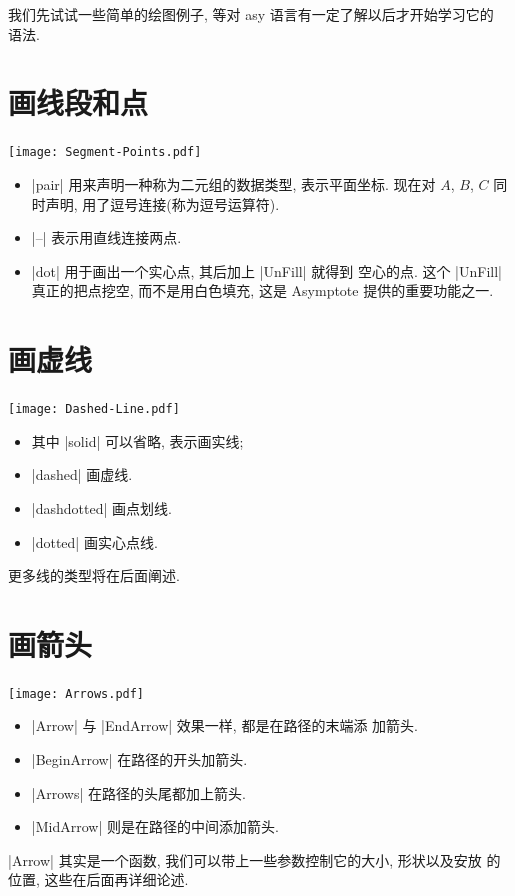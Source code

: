 \documentclass{ctexbook}
\begin{document}
我们先试试一些简单的绘图例子, 等对 asy 语言有一定了解以后才开始学习它的
语法.

\section{画线段和点}
\begin{center}\texttt{[image: Segment-Points.pdf]}\end{center}%

\begin{itemize}
\item |pair| 用来声明一种称为二元组的数据类型, 表示平面坐标. 现在对 $A$,
  $B$, $C$ 同时声明, 用了逗号连接(称为逗号运算符).
\item |--| 表示用直线连接两点.
\item |dot| 用于画出一个实心点, 其后加上 |UnFill| 就得到
  空心的点. 这个 |UnFill| 真正的把点挖空, 而不是用白色填充, 这是
  Asymptote 提供的重要功能之一.
\end{itemize}

\section{画虚线}
\begin{center}\texttt{[image: Dashed-Line.pdf]}\end{center}%

\begin{itemize}
\item  其中 |solid| 可以省略, 表示画实线;
\item |dashed| 画虚线.
\item |dashdotted| 画点划线.
\item |dotted| 画实心点线.
\end{itemize}
更多线的类型将在后面阐述.

\section{画箭头}
\begin{center}\texttt{[image: Arrows.pdf]}\end{center}%


\begin{itemize}
\item |Arrow| 与 |EndArrow| 效果一样, 都是在路径的末端添
  加箭头.
\item |BeginArrow| 在路径的开头加箭头.
\item |Arrows| 在路径的头尾都加上箭头.
\item |MidArrow| 则是在路径的中间添加箭头.
\end{itemize}
|Arrow| 其实是一个函数, 我们可以带上一些参数控制它的大小, 形状以及安放
的位置, 这些在后面再详细论述.
\end{document}
